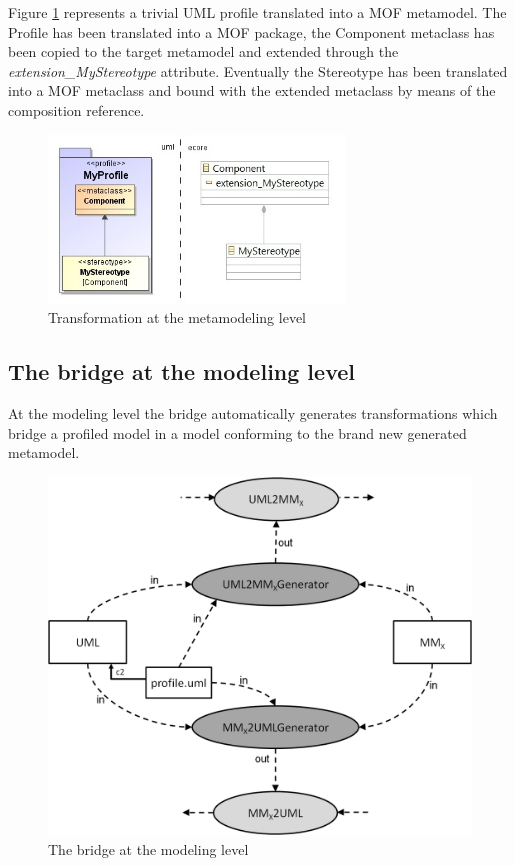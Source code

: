 %
Figure \ref{fig:metamodelingExample} represents a trivial UML profile translated into a MOF metamodel. The Profile has been translated into a MOF package, the Component metaclass has been copied to the target metamodel and extended through the \textit{extension\_MyStereotype} attribute. Eventually the Stereotype has been translated into a MOF metaclass and bound with the extended metaclass by means of the composition reference.
%
\begin{figure}[htbp]
	\centering
		\includegraphics[width=0.70\textwidth]{figures/metamodelingExample.jpg}
	\caption{Transformation at the metamodeling level}
	\label{fig:metamodelingExample}
\end{figure}
%
\subsection{The bridge at the modeling level}\label{sec:modeLevel}

At the modeling level the bridge automatically generates transformations which bridge a profiled model in a model conforming to the brand new generated metamodel.
\begin{figure}[htbp]
	\centering
		\includegraphics[width=1.00\textwidth]{figures/modelingLevel.png}
	\caption{The bridge at the modeling level}
	\label{fig:modelingLevel}
\end{figure}

